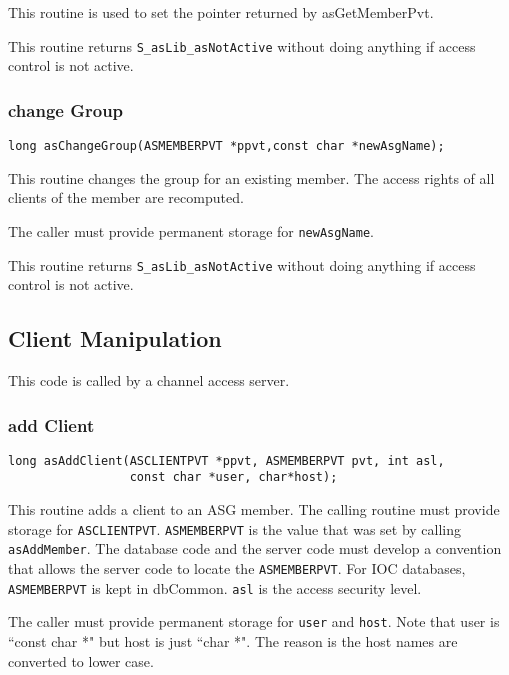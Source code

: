 This routine is used to set the pointer returned by asGetMemberPvt.

This routine returns \verb|S_asLib_asNotActive| without doing anything if access control is not active.

\subsubsection{change Group}

\begin{verbatim}
long asChangeGroup(ASMEMBERPVT *ppvt,const char *newAsgName);
\end{verbatim}
This routine changes the group for an existing member. The access rights of all clients of the member are recomputed.

The caller must provide permanent storage for \verb|newAsgName|.

This routine returns \verb|S_asLib_asNotActive| without doing anything if access control is not active.

\subsection{ Client Manipulation}

This code is called by a channel access server.

\subsubsection{add Client}

\begin{verbatim}
long asAddClient(ASCLIENTPVT *ppvt, ASMEMBERPVT pvt, int asl,
                 const char *user, char*host);
\end{verbatim}

This routine adds a client to an ASG member. The calling routine must provide storage for \verb|ASCLIENTPVT|. 
\verb|ASMEMBERPVT| is the value that was set by calling \verb|asAddMember|. The database code and the server code must develop 
a convention that allows the server code to locate the \verb|ASMEMBERPVT|. For IOC databases,  \verb|ASMEMBERPVT| is kept in 
dbCommon. \verb|asl| is the access security level.

The caller must provide permanent storage for \verb|user| and \verb|host|. Note that user is ``const char *" but host is just ``char *". 
The reason is the host names are converted to lower case.

